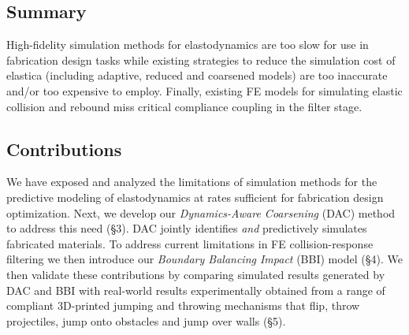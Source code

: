 \subsection{Summary}
High-fidelity simulation methods for elastodynamics are too slow for use in fabrication design tasks while existing strategies to reduce the simulation cost of elastica (including adaptive, reduced and coarsened models) are too inaccurate and/or too expensive to employ. Finally, existing FE models for simulating elastic collision and rebound miss critical compliance coupling in the filter stage.

\subsection{Contributions}
We have exposed and analyzed the limitations of simulation methods for the predictive modeling of elastodynamics at rates sufficient for fabrication design optimization. Next, we develop our \emph{Dynamics-Aware Coarsening} (DAC) method to address this need {(\S3)}. DAC jointly identifies \emph{and} predictively simulates fabricated materials. To address current limitations in FE collision-response filtering we then introduce our \emph{Boundary Balancing Impact} (BBI) model {(\S4)}. 
We then validate these contributions by comparing simulated results generated by DAC and BBI with real-world results experimentally obtained from a range of compliant 3D-printed jumping and throwing mechanisms that flip, throw projectiles, jump onto obstacles and jump over walls (\S5).